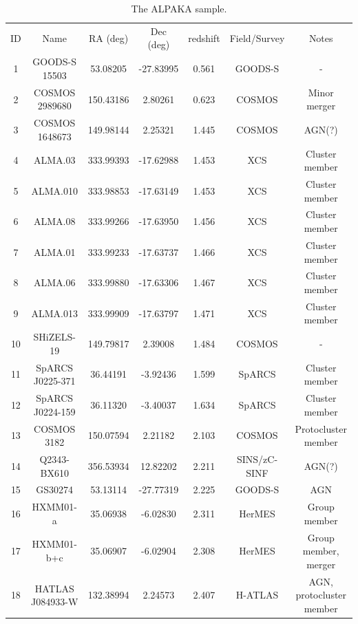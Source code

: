 \begin{table}[htbp!] 
\begin{center}
\caption{The ALPAKA sample. }
\label{tab:tab1}
\begin{tabular}{ccccccc}
\\
\hline\hline \noalign{\smallskip}
ID  &  Name & RA (deg) & Dec (deg) & redshift & Field/Survey & Notes \\
\noalign{\smallskip}
\hline
\noalign{\medskip}
1 & GOODS-S 15503 & 53.08205 & -27.83995 & 0.561 & GOODS-S & - \\ 
2 & COSMOS 2989680 & 150.43186 & 2.80261 & 0.623 & COSMOS & Minor merger\\
3 & COSMOS 1648673 & 149.98144 & 2.25321 & 1.445 & COSMOS & AGN(?) \\
4 & ALMA.03  & 333.99393 & -17.62988 & 1.453 & XCS & Cluster member \\
5 & ALMA.010 & 333.98853 & -17.63149 & 1.453 & XCS & Cluster member\\ %
6 & ALMA.08 & 333.99266 & -17.63950 & 1.456 & XCS & Cluster member\\ %
7 & ALMA.01 & 333.99233 & -17.63737 & 1.466 & XCS & Cluster member\\%
8 & ALMA.06 & 333.99880 & -17.63306 & 1.467 & XCS & Cluster member \\%
9 & ALMA.013 & 333.99909 & -17.63797 & 1.471 & XCS & Cluster member\\
10 & SHiZELS-19 & 149.79817 & 2.39008 & 1.484 & COSMOS & - \\
11 & SpARCS J0225-371 & 36.44191 & -3.92436 & 1.599 & SpARCS & Cluster member\\%
12 & SpARCS J0224-159 & 36.11320 & -3.40037 & 1.634 & SpARCS & Cluster member\\%
13 & COSMOS 3182 & 150.07594 & 2.21182 & 2.103 & COSMOS & Protocluster member\\
14 & Q2343-BX610 & 356.53934 & 12.82202 & 2.211 & SINS/zC-SINF & AGN(?)\\
15 & GS30274 & 53.13114 & -27.77319 & 2.225 & GOODS-S & AGN \\
16 & HXMM01-a & 35.06938 & -6.02830 & 2.311 & HerMES & Group member\\
17 & HXMM01-b+c & 35.06907 & -6.02904 & 2.308 & HerMES &  Group member, merger\\
18 & HATLAS J084933-W & 132.38994 & 2.24573 & 2.407 & H-ATLAS & AGN, protocluster member\\

\end{tabular}
\end{center}
\end{table}
